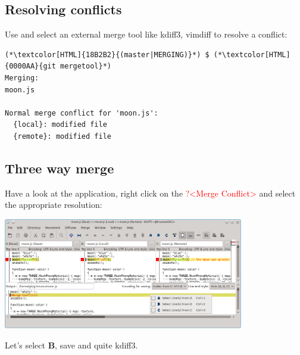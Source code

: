 \subsection{Resolving conflicts}
\begin{frame}[fragile]
  \subslidetitle
  Use  and select an external merge tool like kdiff3, vimdiff to resolve a conflict:

  \begin{lstlisting}
(*\textcolor[HTML]{18B2B2}{(master|MERGING)}*) $ (*\textcolor[HTML]{0000AA}{git mergetool}*)
Merging:
moon.js

Normal merge conflict for 'moon.js':
  {local}: modified file
  {remote}: modified file
\end{lstlisting}

\end{frame}

\subsection{Three way merge}
\begin{frame}[fragile]
  \subslidetitle
  Have a look at the  application, right click on the \textcolor{red}{?<Merge Conflict>} and select the appropriate resolution:
  \newline \vspace{1em}
  \centerline{\includegraphics[width=10.5cm]{../screen/kdiff3.png}}

  \vspace{1em}
  Let's select \textbf{B}, save and quite kdiff3.
\end{frame}

